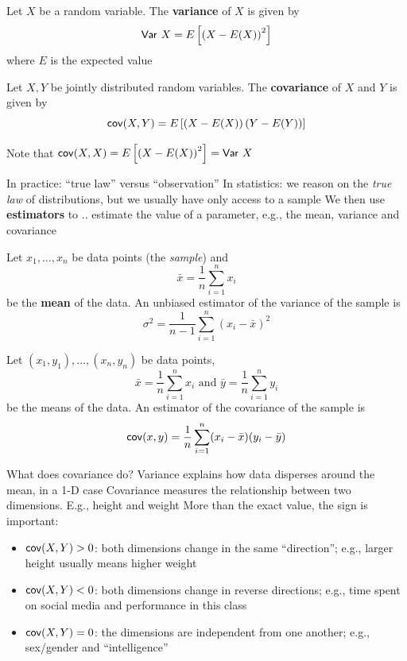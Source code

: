 \documentclass[aspectratio=169]{beamer}\usepackage[]{graphicx}\usepackage[]{xcolor}
\begin{document}
\begin{frame}
\begin{definition}[Variance]
Let $X$ be a random variable. The \textbf{variance} of $X$ is given by
\[
\mathsf{Var}\  X = E\left[\left(X-E(X)\right)^2\right]
\]
where $E$ is the expected value
\end{definition}
\vfill
\begin{definition}[Covariance]
Let $X,Y$ be jointly distributed random variables. The \textbf{covariance} of $X$ and $Y$ is given by
\[
\mathsf{cov} (X,Y) = E\left[\left(X-E(X)\right)\left(Y-E(Y)\right)\right]
\]
\end{definition}
\vfill
Note that $\mathsf{cov}(X,X)=E\left[\left(X-E(X)\right)^2\right] = \mathsf{Var}\  X$
\end{frame}

\begin{frame}{In practice: ``true law'' versus ``observation''}
In statistics: we reason on the \emph{true law} of distributions, but we usually have only access to a sample
\vfill
We then use \textbf{estimators} to .. estimate the value of a parameter, e.g., the mean, variance and covariance
\vfill
\end{frame}
    
\begin{frame}
\begin{definition}
Let $x_1,\ldots,x_n$ be data points (the \emph{sample}) and 
\[
\bar x = \frac 1n \sum_{i=1}^n x_i
\]
be the \textbf{mean} of the data. An unbiased estimator of the variance of the sample is
\[
\sigma^2 = \frac{1}{n-1}\sum_{i=1}^n (x_i-\bar x)^2
\]
\end{definition}
\end{frame}

\begin{frame}
\begin{definition}
Let $(x_1,y_1),\ldots,(x_n,y_n)$ be data points,
\[
\bar x = \frac 1n \sum_{i=1}^n x_i
\textrm{ and }
\bar y = \frac 1n \sum_{i=1}^n y_i
\]
be the means of the data. An estimator of the covariance of the sample is
\[
\mathsf{cov}(x,y) = \frac{1}{n}\sum_{i=1}^n (x_i-\bar x)(y_i-\bar y)
\]
\end{definition}
\end{frame}

\begin{frame}{What does covariance do?}
Variance explains how data disperses around the mean, in a 1-D case
\vfill
Covariance measures the relationship between two dimensions. E.g., height and weight
\vfill
More than the exact value, the sign is important:
\begin{itemize}
    \item $\mathsf{cov}(X,Y)>0$: both dimensions change in the same ``direction''; e.g., larger height usually means higher weight
    \item $\mathsf{cov}(X,Y)<0$: both dimensions change in reverse directions; e.g., time spent on social media and performance in this class
    \item $\mathsf{cov}(X,Y)=0$: the dimensions are independent from one another; e.g., sex/gender and ``intelligence''
\end{itemize}
\end{frame}
\end{document}
